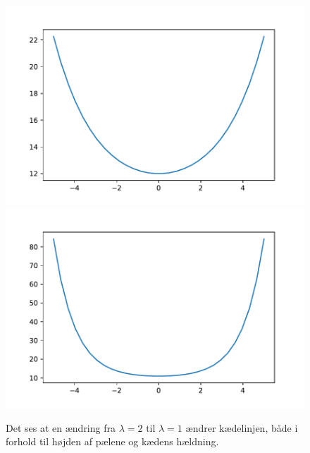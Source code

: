 \begin{figure}[h!]
\includegraphics[scale=0.5]{code/fig3}
\includegraphics[scale=0.5]{code/fig4}
\caption{Det ses at en ændring fra $\lambda=2$ til $\lambda=1$ ændrer kædelinjen, både i forhold til højden af pælene og kædens hældning.}
\end{figure}
%
